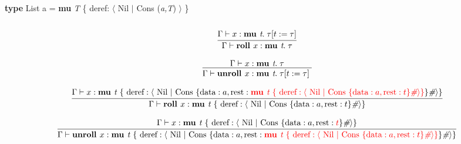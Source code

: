 \documentclass{article}
\begin{document}
\lstset{language=Pascal}          %



\textbf{type} List a = \textbf{mu} \textit{T} \{ deref: $\langle$ Nil $\vert$ Cons (\textit{a,T}) $\rangle$ \} \\ \\

\[
    \infer{
        \Gamma \vdash \textbf{roll } x : \textbf{mu } \textit{t}.\; \tau
    }{
        \Gamma \vdash x : \textbf{mu } \textit{t}.\; \tau[ t := \tau]
    }
\]

\[
\infer{
        \Gamma \vdash \textbf{unroll } x : \textbf{mu } \textit{t}.\; \tau[ t := \tau]\; 
    }{
        \Gamma \vdash x : \textbf{mu } \textit{t}.\; \tau
    }
\]

\[
    \infer{
        \Gamma \vdash \textbf{roll } x : \textbf{mu } \textit{t } \{ \text{ deref}: \langle \text{ Nil } \vert \text{ Cons } \{ \text{data}: a, \text{rest}: t \}\textit{\#} \rangle \} 
    }{
        \Gamma \vdash x : \textbf{mu } \textit{t } \{ \text{ deref}: \langle \text{ Nil } \vert \text{ Cons } \{ \text{data}: a, \text{rest}: {\color{red} \textbf{mu } \textit{t } \{ \text{ deref}: \langle \text{ Nil } \vert \text{ Cons } \{ \text{data}: a, \text{rest}: t \}\textit{\#} \rangle \} } \}\textit{\#} \rangle \} 
    }
\]

\[
    \infer{
        \Gamma \vdash \textbf{unroll } x : \textbf{mu } \textit{t } \{ \text{ deref}: \langle \text{ Nil } \vert \text{ Cons } \{ \text{data}: a, \text{rest}: {\color{red} \textbf{mu } \textit{t } \{ \text{ deref}: \langle \text{ Nil } \vert \text{ Cons } \{ \text{data}: a, \text{rest}: t \}\textit{\#} \rangle \} } \}\textit{\#} \rangle \} 
    }{
        \Gamma \vdash x : \textbf{mu } \textit{t } \{ \text{ deref}: \langle \text{ Nil } \vert \text{ Cons } \{ \text{data}: a, \text{rest}: {\color{red} t} \}\textit{\#} \rangle \} 
    }
\]
\end{document}
